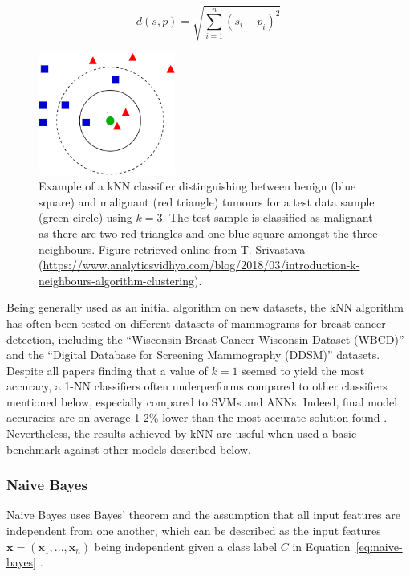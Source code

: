 \begin{equation}
\label{eq:euclidian-distance}
    d(s,p)=\sqrt{\sum_{i=1}^{n}(s_i-p_i)^2}
\end{equation}

\begin{figure}[ht]
\centerline{\includegraphics[width=0.4\textwidth]{Dissertation/figures/litsurvey/knn.png}}
\caption{\label{fig:litsurvey-knn-example}Example of a kNN classifier distinguishing between benign (blue square) and malignant (red triangle) tumours for a test data sample (green circle) using $k=3$. The test sample is classified as malignant as there are two red triangles and one blue square amongst the three neighbours. Figure retrieved online from T. Srivastava (\url{https://www.analyticsvidhya.com/blog/2018/03/introduction-k-neighbours-algorithm-clustering}).}
\end{figure}

Being generally used as an initial algorithm on new datasets, the kNN algorithm has often been tested on different datasets of mammograms for breast cancer detection, including the ``Wisconsin Breast Cancer Wisconsin Dataset (WBCD)'' \cite{Wolberg1995} and the ``Digital Database for Screening Mammography (DDSM)'' \cite{DDSMdataset2001} datasets. Despite all papers finding that a value of $k=1$ seemed to yield the most accuracy, a 1-NN classifiers often underperforms compared to other classifiers mentioned below, especially compared to SVMs and ANNs. Indeed, final model accuracies are on average 1-2\% lower than the most accurate solution found \cite{Yue2018} \cite{Asri2016} \cite{Montazeri2016}. Nevertheless, the results achieved by kNN are useful when used a basic benchmark against other models described below.

\subsubsection{Naive Bayes}

Naive Bayes uses Bayes' theorem and the assumption that all input features are independent from one another, which can be described as the input features $\textbf{x}=(\textbf{x}_1, ..., \textbf{x}_n)$ being independent given a class label $C$ in Equation~\ref{eq:naive-bayes} \cite{rish2001empirical}.

